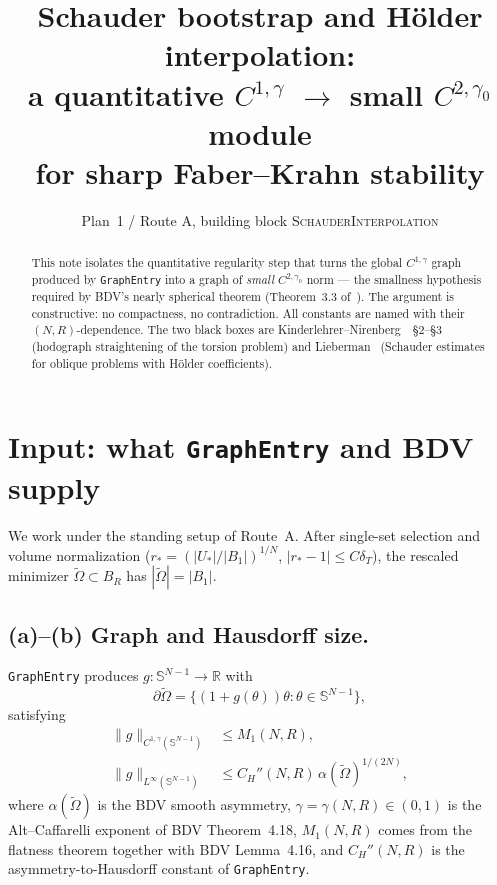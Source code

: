 \documentclass[11pt,a4paper]{article}
\title{Schauder bootstrap and Hölder interpolation:\\
       a quantitative $C^{1,\gamma}$ $\to$ small $C^{2,\gamma_{0}}$ module\\
       for sharp Faber--Krahn stability}
\author{Plan~1 / Route A, building block \textsc{SchauderInterpolation}}
\date{}
\theoremstyle{definition}
\theoremstyle{remark}
\newcommand{\R}{\mathbb{R}}
\newcommand{\Om}{\widetilde{\Omega}}
\newcommand{\Sph}{\mathbb{S}^{N-1}}
\newcommand{\norm}[1]{\lVert#1\rVert}
\newcommand{\bdry}{\partial}
\begin{document}
\maketitle

\begin{abstract}
This note isolates the quantitative regularity step that turns the global
$C^{1,\gamma}$ graph produced by \texttt{GraphEntry} into a graph of
\emph{small} $C^{2,\gamma_{0}}$ norm --- the smallness hypothesis required
by BDV's nearly spherical theorem (Theorem~3.3 of~\cite{BDV}). The argument
is constructive: no compactness, no contradiction. All constants are named
with their $(N,R)$-dependence. The two black boxes are
Kinderlehrer--Nirenberg~\cite{KN}~\S2--\S3 (hodograph straightening of the
torsion problem) and Lieberman~\cite{Li86} (Schauder estimates for oblique
problems with Hölder coefficients).
\end{abstract}

\tableofcontents

\section{Input: what \texttt{GraphEntry} and BDV supply}\label{sec:input}

We work under the standing setup of Route~A. After single-set selection
and volume normalization
($r_{*}=(|U_{*}|/|B_{1}|)^{1/N}$, $|r_{*}-1|\le C\delta_{T}$), the
rescaled minimizer $\Om\subset B_{R}$ has $|\Om|=|B_{1}|$.

\subsection*{(a)--(b) Graph and Hausdorff size.}
\texttt{GraphEntry} produces $g:\Sph\to\R$ with
\begin{equation}\label{eq:graph}
   \bdry\Om=\bigl\{(1+g(\theta))\theta:\theta\in\Sph\bigr\},
\end{equation}
satisfying
\begin{align}
   \norm{g}_{C^{1,\gamma}(\Sph)}    & \le M_{1}(N,R),
   \label{eq:input-a}\\
   \norm{g}_{L^{\infty}(\Sph)}      & \le C_{H}''(N,R)\,
                                      \alpha(\Om)^{1/(2N)},
   \label{eq:input-b}
\end{align}
where $\alpha(\Om)$ is the BDV smooth asymmetry, $\gamma=\gamma(N,R)\in(0,1)$
is the Alt--Caffarelli exponent of BDV Theorem~4.18, $M_{1}(N,R)$ comes
from the flatness theorem together with BDV Lemma~4.16, and $C_{H}''(N,R)$
is the asymmetry-to-Hausdorff constant of \texttt{GraphEntry}.
\end{document}
